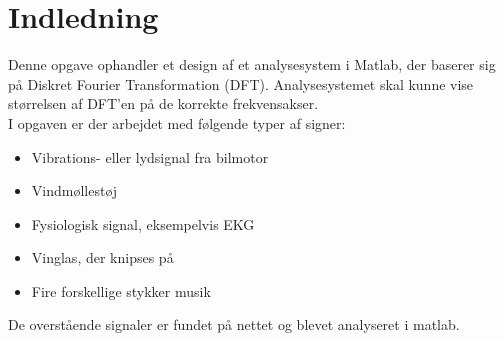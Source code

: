 \chapter{Indledning}\label{ch:introduction}
Denne opgave ophandler et design af et analysesystem i Matlab, der baserer sig på Diskret Fourier Transformation (DFT). 
Analysesystemet skal kunne vise størrelsen af DFT'en på de korrekte frekvensakser.
\\I opgaven er der arbejdet med følgende typer af signer:

\begin{itemize}
	\item Vibrations- eller lydsignal fra bilmotor
	\item Vindmøllestøj
	\item Fysiologisk signal, eksempelvis EKG
	\item Vinglas, der knipses på
	\item Fire forskellige stykker musik	
\end{itemize}

De overstående signaler er fundet på nettet og blevet analyseret i matlab.